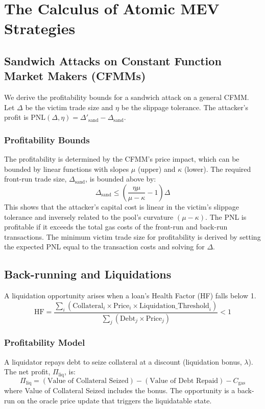 \section{The Calculus of Atomic MEV Strategies}

\subsection{Sandwich Attacks on Constant Function Market Makers (CFMMs)}
We derive the profitability bounds for a sandwich attack on a general CFMM. Let $\Delta$ be the victim trade size and $\eta$ be the slippage tolerance. The attacker's profit is $\text{PNL}(\Delta, \eta) = \Delta'_{\text{sand}} - \Delta_{\text{sand}}$.

\subsubsection{Profitability Bounds}
The profitability is determined by the CFMM's price impact, which can be bounded by linear functions with slopes $\mu$ (upper) and $\kappa$ (lower). The required front-run trade size, $\Delta_{\text{sand}}$, is bounded above by:
$$\Delta_{\text{sand}} \le \left(\frac{\eta\mu}{\mu - \kappa} - 1\right)\Delta$$
This shows that the attacker's capital cost is linear in the victim's slippage tolerance and inversely related to the pool's curvature $(\mu - \kappa)$.  The PNL is profitable if it exceeds the total gas costs of the front-run and back-run transactions. The minimum victim trade size for profitability is derived by setting the expected PNL equal to the transaction costs and solving for $\Delta$.


\subsection{Back-running and Liquidations}
A liquidation opportunity arises when a loan's Health Factor (HF) falls below 1.
$$ \text{HF} = \frac{\sum_{i}(\text{Collateral}_i \times \text{Price}_i \times \text{Liquidation\_Threshold}_i)}{\sum_{j}(\text{Debt}_j \times \text{Price}_j)} < 1 $$

\subsubsection{Profitability Model}
A liquidator repays debt to seize collateral at a discount (liquidation bonus, $\lambda$). The net profit, $\Pi_{\text{liq}}$, is:
$$ \Pi_{\text{liq}} = (\text{Value of Collateral Seized}) - (\text{Value of Debt Repaid}) - C_{\text{gas}} $$
where Value of Collateral Seized includes the bonus. The opportunity is a back-run on the oracle price update that triggers the liquidatable state.

